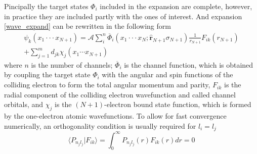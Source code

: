 Pincipally the target states $\Phi_i$ included in the expansion are complete, however, in practice they are included partly with the ones of interest. And expansion \ref{wave_expand} can be rewritten in the following form
\begin{multline} \label{eq_full_expand}
	\psi_k(x_1\cdot\cdot\cdot x_{N+1}) = \mathcal{A}\sum_{i}^{n}\overline{\Phi}_i(x_1\cdot\cdot\cdot x_{N}; \hat{\textbf{r}}_{N+1}\sigma_{N+1}) \frac{1}{r_{N+1}} F_{ik}(r_{N+1}) \\+ \sum_{j=1}^m d_{jk} \chi_j(x_1\cdots x_{N+1}) 
\end{multline}
where $n$ is the number of channels; $\overline{\Phi}_i$ is the channel function, which is obtained by coupling the target state $\Phi_i$ with the angular and spin functions of the colliding electron to form the total angular momentum and parity, $F_{ik}$ is the radial component of the colliding electron wavefunction and called channel orbitals, and $\chi_j$ is the $(N+1)$-electron bound state function, which is formed by the one-electron atomic wavefunctions. To allow for fast convergence numerically, an orthogonality condition is usually required for $l_i = l_j$
\begin{equation} \label{eq_bound_free_orth}
	\langle P_{n_jl_j}|F_{ik}\rangle = \int_{0}^{\infty}P_{n_jl_j}(r)F_{ik}(r)dr=0
\end{equation}
